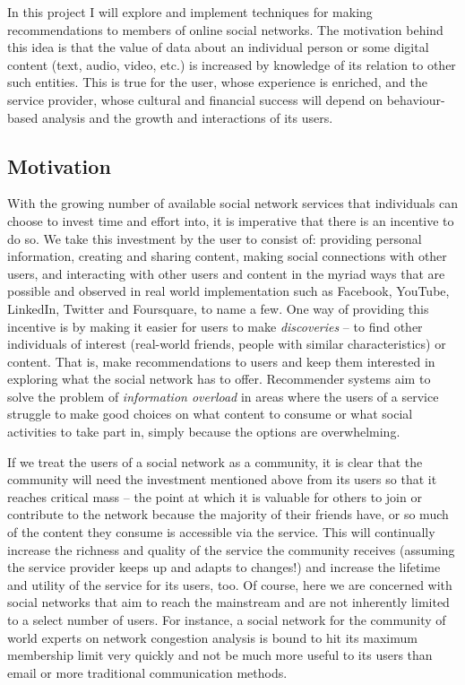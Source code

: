 In this project I will explore and implement techniques for making recommendations to members of online social networks. The motivation behind this idea is that the value of data about an individual person or some digital content (text, audio, video, etc.) is increased by knowledge of its relation to other such entities. This is true for the user, whose experience is enriched, and the service provider, whose cultural and financial success will depend on behaviour-based analysis and the growth and interactions of its users.

\subsection*{Motivation}

With the growing number of available social network services that individuals can choose to invest time and effort into, it is imperative that there is an incentive to do so. We take this investment by the user to consist of: providing personal information, creating and sharing content, making social connections with other users, and interacting with other users and content in the myriad ways that are possible and observed in real world implementation such as Facebook, YouTube, LinkedIn, Twitter and Foursquare, to name a few. One way of providing this incentive is by making it easier for users to make \emph{discoveries} -- to find other individuals of interest (real-world friends, people with similar characteristics) or content. That is, make recommendations to users and keep them interested in exploring what the social network has to offer. Recommender systems aim to solve the problem of \emph{information overload} in areas where the users of a service struggle to make good choices on what content to consume or what social activities to take part in, simply because the options are overwhelming.

If we treat the users of a social network as a community, it is clear that the community will need the investment mentioned above from its users so that it reaches critical mass -- the point at which it is valuable for others to join or contribute to the network because the majority of their friends have, or so much of the content they consume is accessible via the service. This will continually increase the richness and quality of the service the community receives (assuming the service provider keeps up and adapts to changes!) and increase the lifetime and utility of the service for its users, too. Of course, here we are concerned with social networks that aim to reach the mainstream and are not inherently limited to a select number of users. For instance, a social network for the community of world experts on network congestion analysis is bound to hit its maximum membership limit very quickly and not be much more useful to its users than email or more traditional communication methods.

